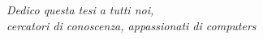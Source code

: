 \vspace{5em}
\begin{flushright}
{\normalsize \textit{Dedico questa tesi a tutti noi,}\\ \textit{cercatori di conoscenza, appassionati di computers}}\\
\end{flushright}

\clearpage{\pagestyle{empty}\cleardoublepage}
